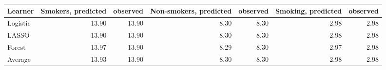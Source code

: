 {\small
\begin{tabular}{lrrrrrr}
\toprule
Learner & Smokers, predicted & observed & Non-smokers, predicted & observed & Smoking, predicted & observed \\
\midrule
Logistic & 13.90 & 13.90 & 8.30 & 8.30 & 2.98 & 2.98 \\
LASSO & 13.90 & 13.90 & 8.30 & 8.30 & 2.98 & 2.98 \\
Forest & 13.97 & 13.90 & 8.29 & 8.30 & 2.97 & 2.98 \\
Average & 13.93 & 13.90 & 8.30 & 8.30 & 2.98 & 2.98 \\
\bottomrule
\end{tabular}
}
